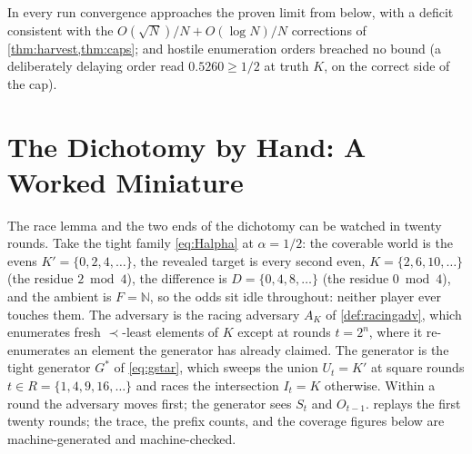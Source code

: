 \documentclass[11pt]{article}
\numberwithin{equation}{section}
\newcommand{\N}{\mathbb{N}}
\newcommand{\Amb}{F}
\newcommand{\Seen}{S}
\newcommand{\Out}{O}
\theoremstyle{plain}
\theoremstyle{definition}
\theoremstyle{remark}
\begin{document}
In every run convergence approaches the proven limit from below, with a deficit consistent
with the $O(\sqrt N)/N + O(\log N)/N$ corrections of \cref{thm:harvest,thm:caps}; and hostile
enumeration orders breached no bound (a deliberately delaying order read $0.5260 \ge 1/2$ at
truth $K$, on the correct side of the cap).

\section{The Dichotomy by Hand: A Worked Miniature}
\label{app:miniature}

The race lemma and the two ends of the dichotomy can be watched in twenty rounds. Take the
tight family \eqref{eq:Halpha} at $\alpha = 1/2$: the coverable world is the evens $K' =
\{0, 2, 4, \dots\}$, the revealed target is every second even, $K = \{2, 6, 10, \dots\}$
(the residue $2 \bmod 4$), the difference is $D = \{0, 4, 8, \dots\}$ (the residue $0 \bmod
4$), and the ambient is $\Amb = \N$, so the odds sit idle throughout: neither player ever
touches them. The adversary is the racing adversary $A_K$ of \cref{def:racingadv}, which
enumerates fresh $\prec$-least elements of $K$ except at rounds $t = 2^n$, where it
re-enumerates an element the generator has already claimed. The generator is the tight
generator $G^*$ of \eqref{eq:gstar}, which sweeps the union $U_t = K'$ at square rounds $t
\in R = \{1, 4, 9, 16, \dots\}$ and races the intersection $I_t = K$ otherwise. Within a
round the adversary moves first; the generator sees $\Seen_t$ and $\Out_{t-1}$.
 replays the first twenty rounds; the trace, the prefix counts, and the
coverage figures below are machine-generated and machine-checked.
\end{document}
